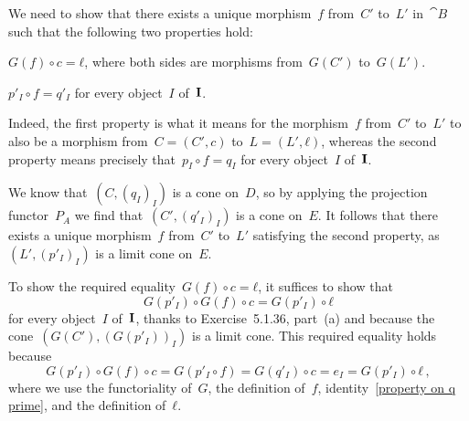 We need to show that there exists a unique morphism~$f$ from~$C'$ to~$L'$ in~$\cat{B}$ such that the following two properties hold:
\begin{enumerate*}

	\item
		$G(f) ∘ c = ℓ$, where both sides are morphisms from~$G(C')$ to~$G(L')$.

	\item
		$p'_I ∘ f = q'_I$ for every object~$I$ of~$\mathbf{I}$.

\end{enumerate*}
Indeed, the first property is what it means for the morphism~$f$ from~$C'$ to~$L'$ to also be a morphism from~$C = (C', c)$ to~$L = (L', ℓ)$, whereas the second property means precisely that~$p_I ∘ f = q_I$ for every object~$I$ of~$\mathbf{I}$.

We know that~$(C, (q_I)_I)$ is a cone on~$D$, so by applying the projection functor~$P_A$ we find that~$(C', (q'_I)_I)$ is a cone on~$E$.
It follows that there exists a unique morphism~$f$ from~$C'$ to~$L'$ satisfying the second property, as~$(L', (p'_I)_I)$ is a limit cone on~$E$.

To show the required equality~$G(f) ∘ c = ℓ$, it suffices to show that
\[
	G(p'_I) ∘ G(f) ∘ c = G(p'_I) ∘ ℓ
\]
for every object~$I$ of~$\mathbf{I}$, thanks to Exercise~5.1.36, part~(a) and because the cone~$(G(C'), (G(p'_I))_I)$ is a limit cone.
This required equality holds because
\[
	G(p'_I) ∘ G(f) ∘ c
	=
	G(p'_I ∘ f)
	=
	G(q'_I) ∘ c
	=
	e_I
	=
	G(p'_I) ∘ ℓ \,,
\]
where we use the functoriality of~$G$, the definition of~$f$, identity~\eqref{property on q prime}, and the definition of~$ℓ$.
